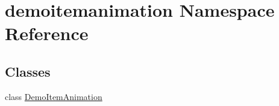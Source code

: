 \hypertarget{namespacedemoitemanimation}{}\section{demoitemanimation Namespace Reference}
\label{namespacedemoitemanimation}
\subsection*{Classes}
\begin{DoxyCompactItemize}
\item 
class \hyperlink{classdemoitemanimation_1_1DemoItemAnimation}{Demo\+Item\+Animation}
\end{DoxyCompactItemize}
